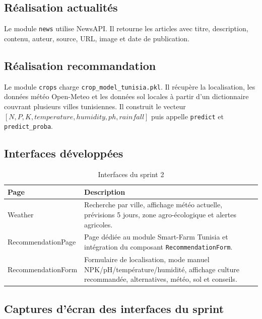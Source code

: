 \subsection{Réalisation actualités}
Le module \texttt{news} utilise NewsAPI. Il retourne les articles avec titre, description, contenu, auteur, source, URL, image et date de publication.

\subsection{Réalisation recommandation}
Le module \texttt{crops} charge \texttt{crop\_model\_tunisia.pkl}. Il récupère la localisation, les données météo Open-Meteo et les données sol locales à partir d'un dictionnaire couvrant plusieurs villes tunisiennes. Il construit le vecteur \([N,P,K,temperature,humidity,ph,rainfall]\) puis appelle \texttt{predict} et \texttt{predict\_proba}.

\subsection{Interfaces développées}
\begin{longtable}{p{3cm}p{11cm}}
\caption{Interfaces du sprint 2}\\
\toprule
\textbf{Page} & \textbf{Description} \\
\midrule
Weather & Recherche par ville, affichage météo actuelle, prévisions 5 jours, zone agro-écologique et alertes agricoles. \\
RecommendationPage & Page dédiée au module Smart-Farm Tunisia et intégration du composant \texttt{RecommendationForm}. \\
RecommendationForm & Formulaire de localisation, mode manuel NPK/pH/température/humidité, affichage culture recommandée, alternatives, météo, sol et conseils. \\
\bottomrule
\end{longtable}

\subsection{Captures d'écran des interfaces du sprint}



